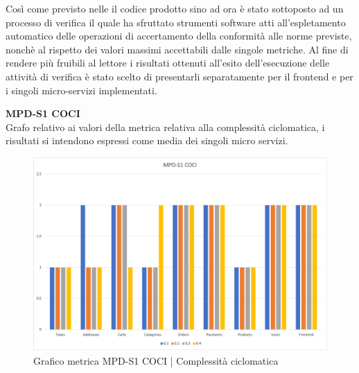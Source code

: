 Così come previsto nelle  il codice prodotto sino ad ora è stato sottoposto ad un processo di verifica il quale 
ha sfruttato strumenti software atti all'espletamento automatico delle operazioni di accertamento della conformità alle norme previste, nonchè
al rispetto dei valori massimi accettabili dalle singole metriche.
Al fine di rendere più fruibili al lettore i risultati ottenuti all'esito dell'esecuzione delle attività di verifica è stato scelto di presentarli
separatamente per il frontend e per i singoli micro-servizi implementati.


\begin{center}
    \textbf{MPD-S1 COCI} \\
    Grafo relativo ai valori della metrica relativa alla complessità ciclomatica, i risultati si intendono espressi come media dei singoli
    micro servizi.
    \begin{figure}[!htb]
        \centering
        \includegraphics[scale=0.50]{res/images/ra/ra_coci.png}
        \caption{Grafico metrica MPD-S1 COCI | Complessità ciclomatica}
    \end{figure}
    \begin{center}
        
    \end{center}


\end{center}
